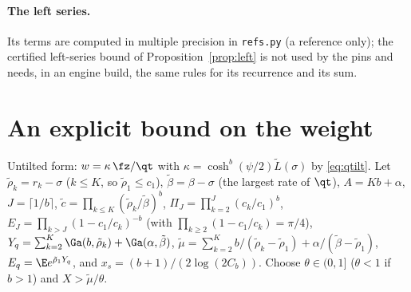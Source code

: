 \paragraph{The left series.} Its terms are computed in multiple precision in \texttt{refs.py} (a reference only); the
certified left-series bound of Proposition~\ref{prop:left} is not used by the pins and needs, in an engine build,
the same rules for its recurrence and its sum.

\section{An explicit bound on the weight}\label{app:explicit}

Untilted form: $w=\kappa\,\fz/\qt$ with $\kappa=\cosh^b(\psi/2)\widetilde L(\sigma)$ by \eqref{eq:qtilt}. Let
$\tilde\rho_k=r_k-\sigma$ ($k\le K$, so $\tilde\rho_1\le c_1$), $\tilde\beta=\beta-\sigma$ (the largest rate of
$\qt$), $A=Kb+\alpha$, $J=\lceil1/b\rceil$, $\tilde c=\prod_{k\le K}(\tilde\rho_k/\tilde\beta)^b$,
$\Pi_J=\prod_{k=2}^J(c_k/c_1)^b$, $E_J=\prod_{k>J}(1-c_1/c_k)^{-b}$ (with $\prod_{k\ge2}(1-c_1/c_k)=\pi/4$),
$Y_q=\sum_{k=2}^K\Ga(b,\tilde\rho_k)+\Ga(\alpha,\tilde\beta)$, $\tilde\mu=\sum_{k=2}^Kb/(\tilde\rho_k-\tilde\rho_1)+
\alpha/(\tilde\beta-\tilde\rho_1)$, $E_q=\E e^{\tilde\rho_1Y_q}$, and $x_s=(b+1)/(2\log(2C_b))$. Choose $\theta\in
(0,1]$ ($\theta<1$ if $b>1$) and $X>\tilde\mu/\theta$.

